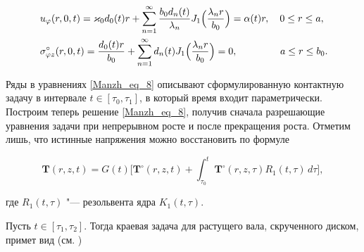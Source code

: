 \begin{align}\label{Manzh_eq_8}%

\hskip-3em

\begin{aligned}

  &

  u_\varphi(r,0,t)=\varkappa_0d_0(t)r

  +\sum_{n=1}^\infty \frac{b_0d_n(t)}{\lambda_n}J_1\Bigl(\frac{\lambda_nr}{b_0}\Bigr)=\alpha(t)r,

\quad    0\leq r\leq a,

\\

  &

  \sigma_{\varphi z}^\circ(r,0,t)=\frac{d_0(t)r}{b_0}

  +\sum_{n=1}^\infty d_n(t)J_1\Bigl(\frac{\lambda_nr}{b_0}\Bigr)=0,

\quad  \qquad  \quad  \

  a\leq r\leq b_0.

\end{aligned}

\hskip-3em

\end{align}



Ряды в уравнениях \eqref{Manzh_eq_8} описывают сформулированную контактную задачу в интервале $t\in[\tau_0,\tau_1]$, в который время входит параметрически. Построим теперь решение \eqref{Manzh_eq_8}, получив сначала разрешающие уравнения задачи при непрерывном росте и после прекращения роста. Отметим лишь, что истинные напряжения можно восстановить по формуле

\begin{equation}\label{Manzh_eq_9}%

  \mathbf T(r,z,t) = G(t)\biggl[\mathbf T^\circ(r,z,t)+ \int_{\tau_0}^t  \mathbf T^\circ(r,z,\tau)R_1(t,\tau)\,d\tau\biggr],

\end{equation}

где $R_1(t,\tau)$ "--- резольвента ядра $K_1(t,\tau)$.



Пусть $t\in[\tau_1,\tau_2]$. Тогда краевая задача для растущего вала, скрученного диском, примет вид (см. \cite{Manzh_bib_05,Manzh_bib_06,Manzh_bib_07,Manzh_bib_08})

